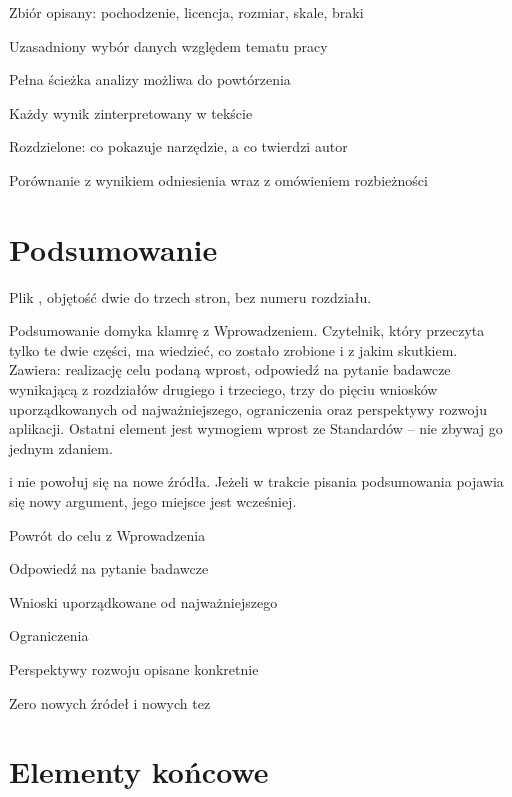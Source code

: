 \begin{kontrolna}
\item Zbiór opisany: pochodzenie, licencja, rozmiar, skale, braki
\item Uzasadniony wybór danych względem tematu pracy
\item Pełna ścieżka analizy możliwa do powtórzenia
\item Każdy wynik zinterpretowany w tekście
\item Rozdzielone: co pokazuje narzędzie, a co twierdzi autor
\item Porównanie z wynikiem odniesienia wraz z omówieniem rozbieżności
\end{kontrolna}

\section{Podsumowanie}

Plik , objętość dwie do trzech stron, bez numeru rozdziału.

Podsumowanie domyka klamrę z Wprowadzeniem. Czytelnik, który przeczyta tylko te dwie części, ma wiedzieć, co zostało zrobione i z jakim skutkiem. Zawiera: realizację celu podaną wprost, odpowiedź na pytanie badawcze wynikającą z rozdziałów drugiego i trzeciego, trzy do pięciu wniosków uporządkowanych od najważniejszego, ograniczenia oraz perspektywy rozwoju aplikacji. Ostatni element jest wymogiem wprost ze Standardów -- nie zbywaj go jednym zdaniem.

 i nie powołuj się na nowe źródła. Jeżeli w trakcie pisania podsumowania pojawia się nowy argument, jego miejsce jest wcześniej.

\begin{kontrolna}
\item Powrót do celu z Wprowadzenia
\item Odpowiedź na pytanie badawcze
\item Wnioski uporządkowane od najważniejszego
\item Ograniczenia
\item Perspektywy rozwoju opisane konkretnie
\item Zero nowych źródeł i nowych tez
\end{kontrolna}

\section{Elementy końcowe}


